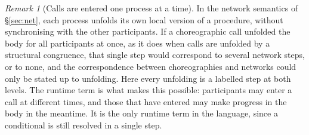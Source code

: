 \documentclass[11pt]{article}
\theoremstyle{plain}
\theoremstyle{definition}
\theoremstyle{remark}
\newtheorem{remark}[theorem]{Remark}
\begin{document}
\begin{remark}[Calls are entered one process at a time]\label{rem:entry}
  In the network semantics of \S\ref{sec:net}, each process unfolds its own
  local version of a procedure, without synchronising with the other
  participants.  If a choreographic call unfolded the body for all
  participants at once, as it does when calls are unfolded by a structural
  congruence, that single step would correspond to several network steps, or
  to none, and the correspondence between choreographies and networks could
  only be stated up to unfolding.  Here every unfolding is a labelled step at
  both levels.  The runtime term is what makes this possible: participants
  may enter a call at different times, and those that have entered may make
  progress in the body in the meantime.  It is the only runtime term in the
  language, since a conditional is still resolved in a single step.
\end{remark}
\end{document}
